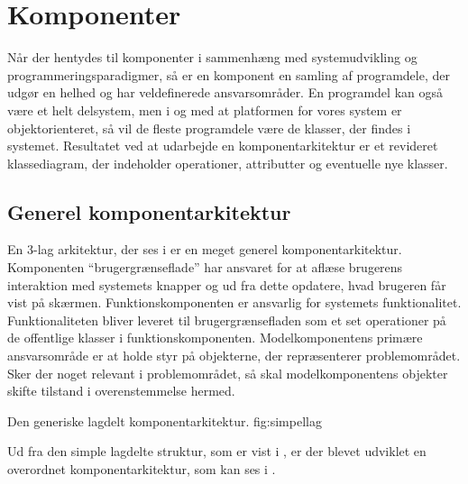\section{Komponenter}
\label{sec:komponenter}
Når der hentydes til komponenter i sammenhæng med systemudvikling og programmeringsparadigmer, så er en komponent en samling af programdele, der udgør en helhed og har veldefinerede ansvarsområder. En programdel kan også være et helt delsystem, men i og med at platformen for vores system er objektorienteret, så vil de fleste programdele være de klasser, der findes i systemet\cite[s.~191]{ooad}. 
Resultatet ved at udarbejde en komponentarkitektur er et revideret klassediagram, der indeholder operationer, attributter og eventuelle nye klasser.

\subsection{Generel komponentarkitektur}
En 3-lag arkitektur\cite{Eckerson1995}, der ses i  er en meget generel komponentarkitektur.
Komponenten ``brugergrænseflade'' har ansvaret for at aflæse brugerens interaktion med systemets knapper og ud fra dette opdatere, hvad brugeren får vist på skærmen. 
Funktionskomponenten er ansvarlig for systemets funktionalitet. Funktionaliteten bliver leveret til brugergrænsefladen som et set operationer på de offentlige klasser i funktionskomponenten. 
Modelkomponentens primære ansvarsområde er at holde styr på objekterne, der repræsenterer problemområdet. Sker der noget relevant i problemområdet, så skal modelkomponentens objekter skifte tilstand i overenstemmelse hermed.

	{Den generiske lagdelt komponentarkitektur.}
	{fig:simpellag}

Ud fra den simple lagdelte struktur, som er vist i , er der blevet udviklet en overordnet komponentarkitektur, som kan ses i .




